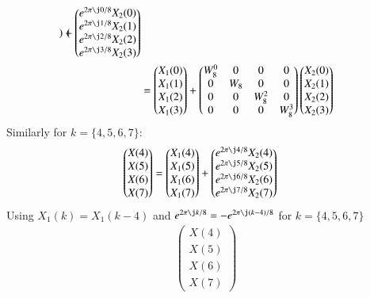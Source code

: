 \documentclass[journal,12pt,twocolumn]{IEEEtran}
\renewcommand\thesection{\arabic{section}}
\begin{document}
\begin{enumerate}[label=\arabic*.,ref=\thesection.\theenumi]
\begin{align}
\begin{pmatrix}
    \end{pmatrix} +
    \begin{pmatrix}
    e^{2\pi\j0/8}X_2(0)\\e^{2\pi\j1/8}X_2(1)\\e^{2\pi\j2/8}X_2(2)\\e^{2\pi\j3/8}X_2(3)
    \end{pmatrix}\\
    &=\begin{pmatrix}
    X_1(0)\\X_1(1)\\X_1(2)\\X_1(3)
    \end{pmatrix} +
    \begin{pmatrix}
    W_8^0&0&0&0\\
    0&W_8&0&0\\
    0&0&W_8^2&0\\
    0&0&0&W_8^3
    \end{pmatrix}
    \begin{pmatrix}
    X_2(0)\\X_2(1)\\X_2(2)\\X_2(3)
    \end{pmatrix}
\end{align}
Similarly for $k=\{4,5,6,7\}$:
\begin{align}
        \begin{pmatrix}
    X(4)\\X(5)\\X(6)\\X(7)
    \end{pmatrix}&=
    \begin{pmatrix}
    X_1(4)\\X_1(5)\\X_1(6)\\X_1(7)
    \end{pmatrix} +
    \begin{pmatrix}
    e^{2\pi\j4/8}X_2(4)\\e^{2\pi\j5/8}X_2(5)\\e^{2\pi\j6/8}X_2(6)\\e^{2\pi\j7/8}X_2(7)
    \end{pmatrix}
    \end{align}
    Using $X_1(k)=X_1(k-4)$ and $e^{2\pi\j k/8}=-e^{2\pi\j(k-4)/8}$ for $k=\{4,5,6,7\}$
    \begin{align}
    \begin{pmatrix}
    X(4)\\X(5)\\X(6)\\X(7)

\end{pmatrix}
\end{align}
\end{enumerate}
\end{document}
